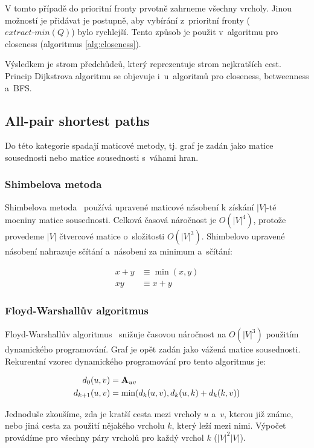\documentclass{bakalarka}
\begin{document}
V tomto případě do prioritní fronty prvotně zahrneme všechny vrcholy. Jinou
možností je přidávat je postupně, aby vybírání z~prioritní fronty
($extract\mbox{-}min(Q)$) bylo rychlejší. Tento způsob je použit v~algoritmu
pro closeness (algoritmus \ref{alg:closeness}).

Výsledkem je strom předchůdců, který reprezentuje strom nejkratších cest.
Princip Dijkstrova algoritmu se objevuje i~u~algoritmů pro closeness,
betweenness a~BFS. 



\subsection{All-pair shortest paths}
Do této kategorie spadají maticové metody, tj. graf je zadán jako matice
sousednosti nebo matice sousednosti s~váhami hran.


\subsubsection{Shimbelova metoda}
Shimbelova metoda~\citep{shimbel1955} používá upravené maticové násobení k
získání $|V|$-té mocniny matice sousednosti. Celková časová náročnost je
$O(|V|^4)$, protože provedeme $|V|$  čtvercové matice o~složitosti
$O(|V|^3)$.  Shimbelovo upravené násobení nahrazuje sčítání a~násobení za
minimum a~sčítání:

\begin{align*}
x + y &\equiv \min(x, y) \\
xy &\equiv x + y
\end{align*}

\subsubsection{Floyd-Warshallův algoritmus}
Floyd-Warshallův algoritmus~\citep{CLRS,floydwarshall1962} snižuje časovou
náročnost na $O(|V|^3)$ použitím dynamického programování. Graf je opět zadán
jako vážená matice sousednosti. Rekurentní vzorec dynamického programování pro
tento algoritmus je:

\begin{align*}
d_0(u, v) &= {\bf A}_{uv} \\
d_{k + 1}(u, v) &= \min(d_k(u, v), d_k(u, k) + d_k(k, v)) \\
\end{align*}

Jednoduše zkoušíme, zda je kratší cesta mezi vrcholy $u$ a~$v$, kterou již
známe, nebo jiná cesta za použití nějakého vrcholu $k$, který leží mezi nimi.
Výpočet provádíme pro všechny páry vrcholů pro každý vrchol $k$ ($|V|^2 |V|$).
\end{document}
